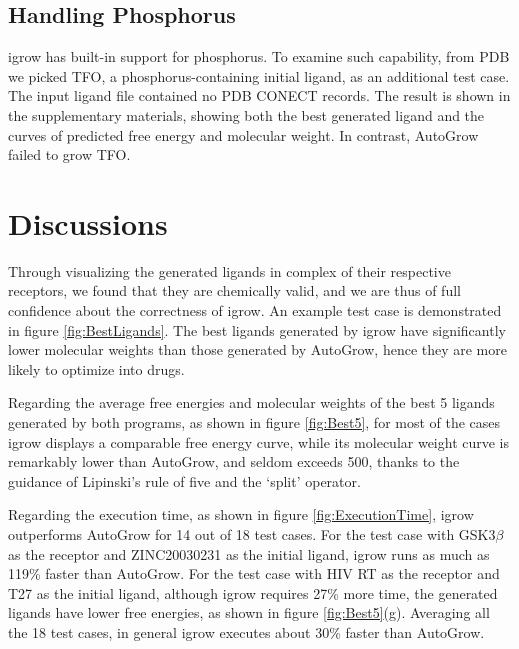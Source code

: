 \documentclass[10pt,conference,letterpaper]{IEEEtran}
\begin{document}
\subsection{Handling Phosphorus}
igrow has built-in support for phosphorus. To examine such capability, from PDB we picked TFO, a phosphorus-containing initial ligand, as an additional test case. The input ligand file contained no PDB CONECT records. The result is shown in the supplementary materials, showing both the best generated ligand and the curves of predicted free energy and molecular weight. In contrast, AutoGrow failed to grow TFO.


\section{Discussions}\label{sec:discussions}
Through visualizing the generated ligands in complex of their respective receptors, we found that they are chemically valid, and we are thus of full confidence about the correctness of igrow. An example test case is demonstrated in figure \ref {fig:BestLigands}.
The best ligands generated by igrow have significantly lower molecular weights than those generated by AutoGrow, hence they are more likely to optimize into drugs.

Regarding the average free energies and molecular weights of the best 5 ligands generated by both programs, as shown in figure \ref{fig:Best5}, for most of the cases igrow displays a comparable free energy curve, while its molecular weight curve is remarkably lower than AutoGrow, and seldom exceeds 500, thanks to the guidance of Lipinski's rule of five and the `split' operator.

Regarding the execution time, as shown in figure \ref{fig:ExecutionTime}, igrow outperforms AutoGrow for 14 out of 18 test cases.
For the test case with GSK3$\beta$ as the receptor and ZINC20030231 as the initial ligand, igrow runs as much as 119\% faster than AutoGrow.
For the test case with HIV RT as the receptor and T27 as the initial ligand, although igrow requires 27\% more time, the generated ligands have lower free energies, as shown in figure \ref{fig:Best5}(g).
Averaging all the 18 test cases, in general igrow executes about 30\% faster than AutoGrow.
\end{document}
